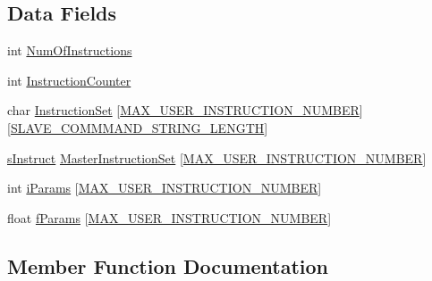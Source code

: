 \subsection*{Data Fields}
\begin{DoxyCompactItemize}
\item 
int \mbox{\hyperlink{struct_user_instructions_a801574205a73598195471b820f1763be}{Num\+Of\+Instructions}}
\item 
int \mbox{\hyperlink{struct_user_instructions_a26a097e6ac6075df0ef181583a49dbc4}{Instruction\+Counter}}
\item 
char \mbox{\hyperlink{struct_user_instructions_aa855f63db27eea10ab7868ae1e145eca}{Instruction\+Set}} \mbox{[}\mbox{\hyperlink{_master_8h_a495826fb50dc325303ad65b8a2e2ca8a}{M\+A\+X\+\_\+\+U\+S\+E\+R\+\_\+\+I\+N\+S\+T\+R\+U\+C\+T\+I\+O\+N\+\_\+\+N\+U\+M\+B\+ER}}\mbox{]}\mbox{[}\mbox{\hyperlink{_s_p_i___instruction_set_8h_afb2f23f8980c03317ec47ce151335ec7}{S\+L\+A\+V\+E\+\_\+\+C\+O\+M\+M\+M\+A\+N\+D\+\_\+\+S\+T\+R\+I\+N\+G\+\_\+\+L\+E\+N\+G\+TH}}\mbox{]}
\item 
\mbox{\hyperlink{_s_p_i___instruction_set_8h_a949ec019a0f52780dcdd7d5a5ba73e47}{s\+Instruct}} \mbox{\hyperlink{struct_user_instructions_a2776e44080e40571fdf163b46b013aef}{Master\+Instruction\+Set}} \mbox{[}\mbox{\hyperlink{_master_8h_a495826fb50dc325303ad65b8a2e2ca8a}{M\+A\+X\+\_\+\+U\+S\+E\+R\+\_\+\+I\+N\+S\+T\+R\+U\+C\+T\+I\+O\+N\+\_\+\+N\+U\+M\+B\+ER}}\mbox{]}
\item 
int \mbox{\hyperlink{struct_user_instructions_a4ba3c6344f3e8a9eb013e2da82940d63}{i\+Params}} \mbox{[}\mbox{\hyperlink{_master_8h_a495826fb50dc325303ad65b8a2e2ca8a}{M\+A\+X\+\_\+\+U\+S\+E\+R\+\_\+\+I\+N\+S\+T\+R\+U\+C\+T\+I\+O\+N\+\_\+\+N\+U\+M\+B\+ER}}\mbox{]}
\item 
float \mbox{\hyperlink{struct_user_instructions_a2f3be588265c4ed198e1687433e53754}{f\+Params}} \mbox{[}\mbox{\hyperlink{_master_8h_a495826fb50dc325303ad65b8a2e2ca8a}{M\+A\+X\+\_\+\+U\+S\+E\+R\+\_\+\+I\+N\+S\+T\+R\+U\+C\+T\+I\+O\+N\+\_\+\+N\+U\+M\+B\+ER}}\mbox{]}
\end{DoxyCompactItemize}


\subsection{Member Function Documentation}
\mbox{\label{struct_user_instructions_a5fe93c82cf239bddd972595fe71a2196}} 
